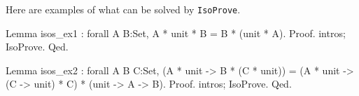 Here are examples of what can be solved by {\tt IsoProve}.
\begin{coq_example*}
Lemma isos_ex1 : 
  forall A B:Set, A * unit * B = B * (unit * A).
Proof.
intros; IsoProve.
Qed.

Lemma isos_ex2 :
  forall A B C:Set,
    (A * unit -> B * (C * unit)) =
    (A * unit -> (C -> unit) * C) * (unit -> A -> B).
Proof.
intros; IsoProve.
Qed.
\end{coq_example*}

